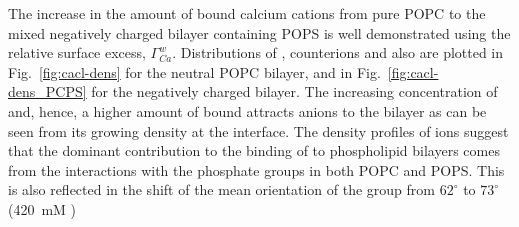 \documentclass[12pt,a4paper,twoside,openright]{report}
\begin{document}
The increase in the amount of bound calcium cations from pure POPC to the mixed negatively charged bilayer containing POPS
is well demonstrated using the relative surface excess, $\Gamma ^w _{Ca}$.
Distributions of ,  counterions and also  
are plotted in Fig.~\ref{fig:cacl-dens} for the neutral POPC bilayer, 
and in Fig.~\ref{fig:cacl-dens_PCPS} for the negatively charged bilayer. 
The increasing concentration of  and, hence, a higher amount of bound 
attracts  anions to the bilayer 
as can be seen from its growing density at the interface. 
The density profiles of ions suggest that
the dominant contribution to the binding of  to phospholipid bilayers
comes from the interactions with the phosphate groups in both POPC and POPS. 
This is also reflected in the shift of the mean orientation 
of the  group from $62^\circ$ to $73^\circ$ (420~mM )
\end{document}

